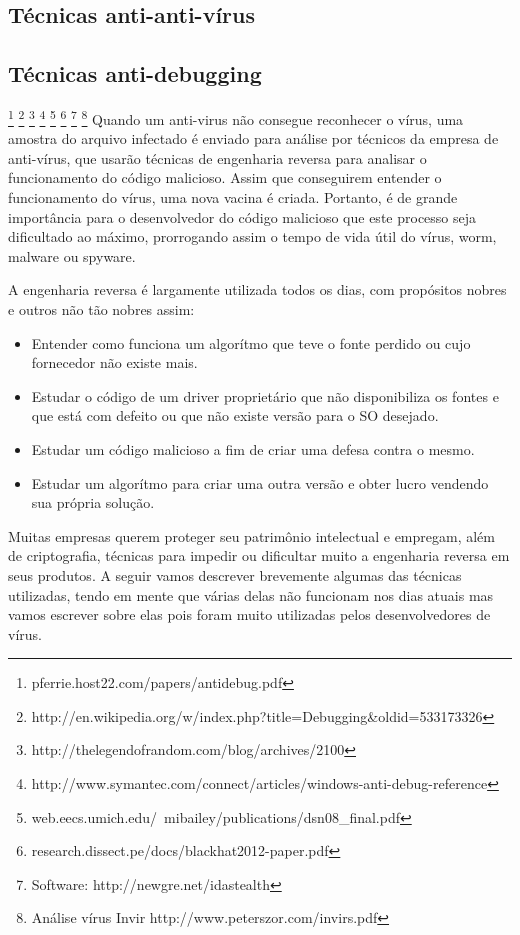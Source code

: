\subsection{Técnicas anti-anti-vírus}

\subsection{Técnicas anti-debugging} 
\footnote{pferrie.host22.com/papers/antidebug.pdf}
\footnote{http://en.wikipedia.org/w/index.php?title=Debugging\&oldid=533173326} 
\footnote{http://thelegendofrandom.com/blog/archives/2100} 
\footnote{http://www.symantec.com/connect/articles/windows-anti-debug-reference}
\footnote{web.eecs.umich.edu/~mibailey/publications/dsn08\_final.pdf} 
\footnote{research.dissect.pe/docs/blackhat2012-paper.pdf}
\footnote{Software: http://newgre.net/idastealth}
\footnote{Análise vírus Invir http://www.peterszor.com/invirs.pdf}
Quando um anti-virus não consegue reconhecer o vírus, uma amostra do arquivo infectado é enviado para análise por técnicos da empresa de anti-vírus, que usarão técnicas de engenharia reversa para analisar o funcionamento do código malicioso. Assim que conseguirem entender o funcionamento do vírus, uma nova vacina é criada. Portanto, é de grande importância para o desenvolvedor do código malicioso que este processo seja dificultado ao máximo, prorrogando assim o tempo de vida útil do vírus, worm, malware ou spyware. 

A engenharia reversa é largamente utilizada todos os dias, com propósitos nobres e outros não tão nobres assim:
\begin{itemize}
 \item Entender como funciona um algorítmo que teve o fonte perdido ou cujo fornecedor não existe mais.
 \item Estudar o código de um driver proprietário que não disponibiliza os fontes e que está com defeito ou que não existe versão para o SO desejado. 
 \item Estudar um código malicioso a fim de criar uma defesa contra o mesmo.
 \item Estudar um algorítmo para criar uma outra versão e obter lucro vendendo sua própria solução.
\end{itemize}

Muitas empresas querem proteger seu patrimônio intelectual e empregam, além de criptografia, técnicas para impedir ou dificultar muito a engenharia reversa em seus produtos. A seguir vamos descrever brevemente algumas das técnicas utilizadas, tendo em mente que várias delas não funcionam nos dias atuais mas vamos escrever sobre elas pois foram muito utilizadas pelos desenvolvedores de vírus. 



